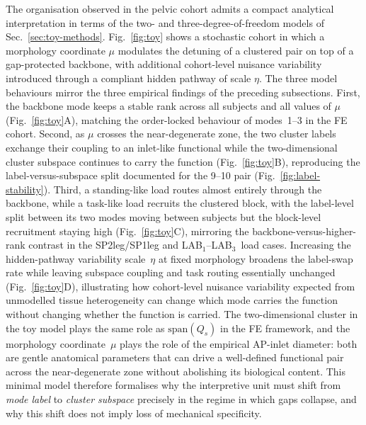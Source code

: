 \documentclass[11pt]{article}
\newcommand{\LAB}{LAB$_1$--LAB$_3$}
\begin{document}
The organisation observed in the pelvic cohort admits a compact analytical interpretation in terms of the two- and three-degree-of-freedom models of Sec.~\ref{sec:toy-methods}.
Fig.~\ref{fig:toy} shows a stochastic cohort in which a morphology coordinate $\mu$ modulates the detuning of a clustered pair on top of a gap-protected backbone, with additional cohort-level nuisance variability introduced through a compliant hidden pathway of scale $\eta$.
The three model behaviours mirror the three empirical findings of the preceding subsections.
First, the backbone mode keeps a stable rank across all subjects and all values of $\mu$ (Fig.~\ref{fig:toy}A), matching the order-locked behaviour of modes~1--3 in the FE cohort.
Second, as $\mu$ crosses the near-degenerate zone, the two cluster labels exchange their coupling to an inlet-like functional while the two-dimensional cluster subspace continues to carry the function (Fig.~\ref{fig:toy}B), reproducing the label-versus-subspace split documented for the 9--10 pair (Fig.~\ref{fig:label-stability}).
Third, a standing-like load routes almost entirely through the backbone, while a task-like load recruits the clustered block, with the label-level split between its two modes moving between subjects but the block-level recruitment staying high (Fig.~\ref{fig:toy}C), mirroring the backbone-versus-higher-rank contrast in the SP2leg/SP1leg and \LAB\ load cases.
Increasing the hidden-pathway variability scale~$\eta$ at fixed morphology broadens the label-swap rate while leaving subspace coupling and task routing essentially unchanged (Fig.~\ref{fig:toy}D), illustrating how cohort-level nuisance variability expected from unmodelled tissue heterogeneity can change which mode carries the function without changing whether the function is carried.
The two-dimensional cluster in the toy model plays the same role as $\mathrm{span}(Q_s)$ in the FE framework, and the morphology coordinate~$\mu$ plays the role of the empirical AP-inlet diameter: both are gentle anatomical parameters that can drive a well-defined functional pair across the near-degenerate zone without abolishing its biological content.
This minimal model therefore formalises why the interpretive unit must shift from \emph{mode label} to \emph{cluster subspace} precisely in the regime in which gaps collapse, and why this shift does not imply loss of mechanical specificity.
\end{document}
